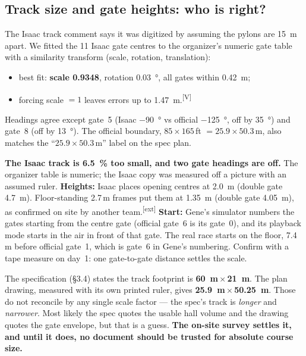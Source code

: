 \documentclass[10pt,a4paper]{article}
\newcommand{\V}{\textsuperscript{\textcolor{okgreen}{[V]}}}
\newcommand{\X}{\textsuperscript{\textcolor{ink}{[ext]}}}
\begin{document}
\subsection{Track size and gate heights: who is right?}\label{sec:track}
The Isaac track comment says it was digitized by assuming the pylons are \SI{15}{m} apart. We fitted the 11 Isaac gate centres to the organizer's numeric gate table with a similarity transform (scale, rotation, translation):
\begin{itemize}
\item best fit: \textbf{scale 0.9348}, rotation \SI{0.03}{\degree}, all gates within \SI{0.42}{m};
\item forcing scale $=1$ leaves errors up to \SI{1.47}{m}.\V
\end{itemize}
Headings agree except gate~5 (Isaac \SI{-90}{\degree} vs official \SI{-125}{\degree}, off by \SI{35}{\degree}) and gate~8 (off by \SI{13}{\degree}).
The official boundary, $85\times165$\,ft $=25.9\times50.3$\,m, also matches the ``$25.9\times50.3$\,m'' label on the spec plan.
\begin{verdict}
\textbf{The Isaac track is \SI{6.5}{\percent} too small, and two gate headings are off.} The organizer table is numeric; the Isaac copy was measured off a picture with an assumed ruler.
\textbf{Heights:} Isaac places opening centres at \SI{2.0}{m} (double gate \SI{4.7}{m}). Floor-standing 2.7\,m frames put them at \SI{1.35}{m} (double gate \SI{4.05}{m}), as confirmed on site by another team.\X
\textbf{Start:} Gene's simulator numbers the gates starting from the centre gate (official gate~6 is its gate~0), and its playback mode starts in the air in front of that gate. The real race starts on the floor, 7.4\,m before official gate~1, which is gate~6 in Gene's numbering.
Confirm with a tape measure on day~1: one gate-to-gate distance settles the scale.
\end{verdict}
\begin{warnbox}
The specification (\S3.4) states the track footprint is \textbf{\SI{60}{m}\,$\times$\,\SI{21}{m}}. The plan drawing, measured with its own printed ruler, gives \textbf{\SI{25.9}{m}\,$\times$\,\SI{50.25}{m}}. Those do not reconcile by any single scale factor --- the spec's track is \emph{longer} and \emph{narrower}. Most likely the spec quotes the usable hall volume and the drawing quotes the gate envelope, but that is a guess. \textbf{The on-site survey settles it, and until it does, no document should be trusted for absolute course size.}
\end{warnbox}
\end{document}
